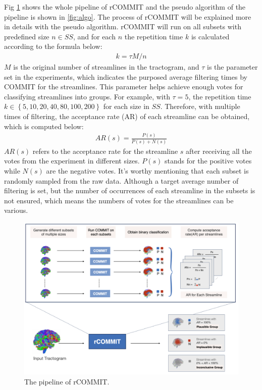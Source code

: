 Fig \ref{fig:pipe} shows the whole pipeline of rCOMMIT and the pseudo algorithm of the pipeline is shown in \ref{fig:algo}. 
The process of rCOMMIT will be explained more in details with the pseudo algorithm. rCOMMIT will run on all subsets with predefined
size $n \in SS$, and for each $n$ the repetition time $k$ is calculated according to the formula below:
\begin{gather}\label{computek}  
    k = \tau M/n
\end{gather}
$M$ is the original number of streamlines in the tractogram, and $\tau$ is the parameter set in the experiments, 
which indicates the purposed average filtering times by COMMIT for the streamlines. This parameter helps achieve enough votes for classifying streamlines into groups.
For example, with $\tau=5$, the repetition time $k \in \left \{5, 10, 20, 40, 80, 100, 200 \right \}$ for each size in $SS$.
Therefore, with multiple times of filtering, the acceptance rate (AR) of each streamline can be obtained, which is computed below:
\begin{gather}\label{AR}
    AR(s) = \frac{P(s)}{P(s)+ N(s)}
\end{gather}
$AR(s)$ refers to the acceptance rate for the streamline $s$ after receiving all the votes from the experiment in different sizes.
$P(s)$ stands for the positive votes while $N(s)$ are the negative votes.
It's worthy mentioning that each subset is randomly sampled from the raw data. 
Although a target average number of filtering is set, but the number of occurrences of each streamline in the subsets is not ensured, 
which means the numbers of votes for the streamlines can be various.

\begin{figure}[ht]
    \centering
    \includegraphics[width= 16cm]{figures/pipe.png}
        \caption{The pipeline of rCOMMIT. 
        }
    \label{fig:pipe}
\end{figure}


